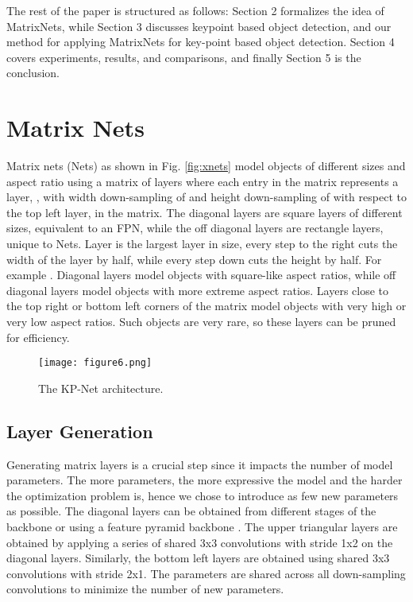 \documentclass[10pt,twocolumn,letterpaper]{article}
\begin{document}
The rest of the paper is structured as follows: Section 2 formalizes the idea of MatrixNets, while Section 3 discusses keypoint based object detection, and our method for applying MatrixNets for key-point based object detection. Section 4 covers experiments, results, and comparisons, and finally Section 5 is the conclusion.


\section{Matrix Nets}
\vspace{-0.25cm}
Matrix nets (Nets) as shown in Fig. \ref{fig:xnets} model objects of different sizes and aspect ratio using a matrix of layers where each entry  in the matrix represents a layer, , with width down-sampling of  and height down-sampling of  with respect to the top left layer,  in the matrix.  The diagonal layers are square layers of different sizes, equivalent to an FPN, while the off diagonal layers are rectangle layers, unique to Nets. Layer  is the largest layer in size, every step to the right cuts the width of the layer by half, while every step down cuts the height by half. For example . Diagonal layers model objects with square-like aspect ratios, while off diagonal layers model objects with more extreme aspect ratios. Layers close to the top right or bottom left corners of the matrix model objects with very high or very low aspect ratios. Such objects are very rare, so these layers can be pruned for efficiency.

\begin{figure}[t]
\begin{center}
\texttt{[image: figure6.png]}
\end{center}
\vspace{-0.25cm}
  \caption{The KP-Net architecture.}
\label{fig:long}
\label{fig:KPxNet}
\vspace{-0.5cm}
\end{figure}
\subsection{Layer Generation}
\vspace{-0.25cm}
Generating matrix layers is a crucial step since it impacts the number of model parameters. The more parameters, the more expressive the model and the harder the optimization problem is, hence we chose to introduce as few new parameters as possible. The diagonal layers can be obtained from different stages of the backbone or using a feature pyramid backbone  \cite{lin2017feature}. The upper triangular layers are obtained by applying a series of shared 3x3 convolutions with stride 1x2 on the diagonal layers. Similarly, the bottom left layers are obtained using shared 3x3 convolutions with stride 2x1. The parameters are shared across all down-sampling convolutions to minimize the number of new parameters.
\end{document}
